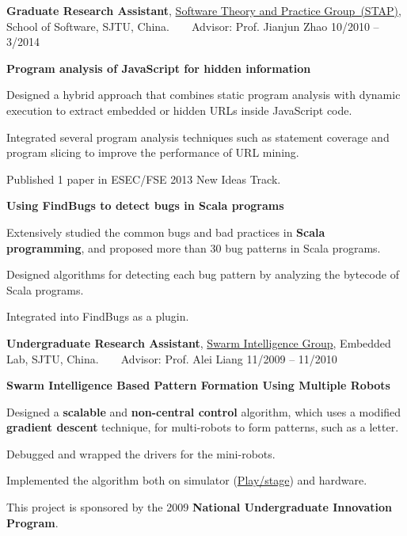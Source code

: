 \documentclass[10pt]{article}
\newcommand{\halfblankline}{\quad\vspace{-0.5\baselineskip}\pagebreak[3]}
\begin{document}
{\halfblankline

\textbf{Graduate Research Assistant}, \href{http://stap.sjtu.edu.cn}{Software Theory and Practice Group~(STAP)}, School of Software, SJTU, China.~~~~Advisor: Prof. Jianjun Zhao	\hfill	10/2010 -- 3/2014
\begin{outerlist}
\item[] \textbf{Program analysis of JavaScript for hidden information}	%
\begin{innerlist}
\item Designed a hybrid approach that combines static program analysis with dynamic execution to extract embedded or hidden URLs inside JavaScript code.
\item Integrated several program analysis techniques such as statement coverage and program slicing to improve the performance of URL mining.
\item Published 1 paper in ESEC/FSE 2013 New Ideas Track.
\end{innerlist}

\item[] \textbf{Using FindBugs to detect bugs in Scala programs}	%
\begin{innerlist}
\item	Extensively studied the common bugs and bad practices in \textbf{Scala programming}, and proposed more than 30 bug patterns in Scala programs. 
\item 	Designed algorithms for detecting each bug pattern by analyzing the bytecode of Scala programs. 
\item Integrated into FindBugs as a plugin.
\end{innerlist}

\end{outerlist}

\halfblankline

\textbf{Undergraduate Research Assistant}, \href{http://202.120.38.22:1000/wiki/index.php/Main_Page}{Swarm Intelligence Group}, Embedded Lab, SJTU, China.~~~~Advisor: Prof. Alei Liang	 \hfill	11/2009 -- 11/2010
\begin{outerlist}	
\item[] \textbf{Swarm Intelligence Based Pattern Formation Using Multiple Robots} 
\begin{innerlist}
\item Designed a \textbf{scalable} and \textbf{non-central control} algorithm, which uses a modified \textbf{gradient descent} technique, for multi-robots to form patterns, such as a letter.
\item Debugged and wrapped the drivers for the mini-robots.
\item Implemented the algorithm both on simulator (\href{http://playerstage.sourceforge.net/}{Play/stage}) and hardware.
\item This project is sponsored by the 2009 \textbf{National Undergraduate Innovation Program}.
\end{innerlist}
	
\end{outerlist}
}
\end{document}
